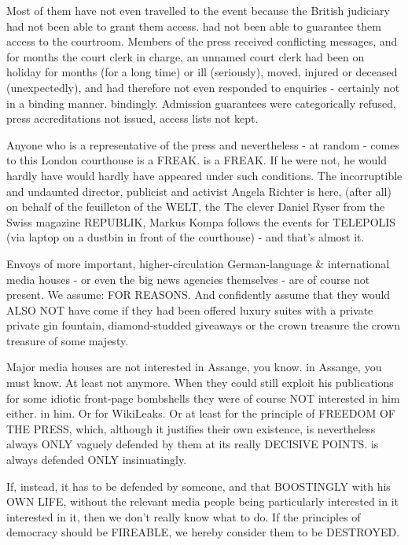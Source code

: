 \begin{multicols}{2}
Most of them have not even travelled to the event because
the British judiciary had not been able to grant them access.
had not been able to guarantee them access to the courtroom. Members of the press received conflicting messages, and for months the court clerk in charge, an
unnamed court clerk had been on holiday for months
(for a long time) or ill (seriously), moved, injured or deceased (unexpectedly), and had therefore not even responded to enquiries - certainly not in a binding manner.
bindingly. Admission guarantees were categorically refused, press accreditations not issued, access lists not kept.

Anyone who is a representative of the press and nevertheless - at random - comes to this London courthouse is a FREAK.
is a FREAK. If he were not, he would hardly have
would hardly have appeared under such conditions. The incorruptible and undaunted director, publicist and activist Angela Richter is here,
(after all) on behalf of the feuilleton of the WELT, the
The clever Daniel Ryser from the Swiss magazine REPUBLIK, Markus Kompa follows the events for TELEPOLIS (via laptop on a dustbin in front of the courthouse) - and that's almost it.

Envoys of more important, higher-circulation German-language \& international media houses - or even
the big news agencies themselves - are of course not present. We assume: FOR REASONS.
And confidently assume that they would ALSO NOT have come
if they had been offered luxury suites with a private
private gin fountain, diamond-studded giveaways or the crown treasure
the crown treasure of some majesty.

Major media houses are not interested in Assange, you know.
in Assange, you must know. At least not
anymore. When they could still exploit his publications for some idiotic front-page bombshells
they were of course NOT interested in him either.
in him. Or for WikiLeaks. Or at least for the
principle of FREEDOM OF THE PRESS, which, although it justifies their own existence, is nevertheless always ONLY vaguely defended by them at its really DECISIVE POINTS.
is always defended ONLY insinuatingly.

If, instead, it has to be defended by someone, and that BOOSTINGLY with his OWN LIFE, without the relevant media people being particularly interested in it
interested in it, then we don't really know what to do. If the principles of democracy should be FIREABLE, we hereby consider them to be
DESTROYED.


\end{multicols}
